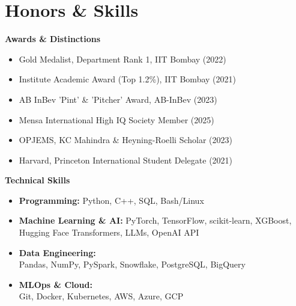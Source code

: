 \documentclass[letterpaper,10pt]{article}
\begin{document}
\section{Honors \& Skills}
{\small
\begin{multicols}{2}

{\vspace{-4pt}\scshape\raggedright\large\bfseries Awards \& Distinctions}\vspace{-6pt}
\begin{itemize}[leftmargin=0.15in, itemsep=-2pt]
  \item Gold Medalist, Department Rank 1, IIT Bombay (2022)
  \item Institute Academic Award (Top 1.2\%), IIT Bombay (2021)
  \item AB InBev 'Pint' \& 'Pitcher' Award, AB-InBev (2023)
  \item Mensa International High IQ Society Member (2025)
  \item OPJEMS, KC Mahindra \&  Heyning-Roelli Scholar  (2023)
  \item Harvard, Princeton International Student Delegate (2021)
\end{itemize}

\columnbreak

{\vspace{-4pt}\scshape\raggedright\large\bfseries Technical Skills}\vspace{4pt}
\begin{itemize}[leftmargin=0.15in]
  \item \textbf{Programming:} Python, C++, SQL, Bash/Linux 
  \item \textbf{Machine Learning \& AI:} PyTorch, TensorFlow, scikit-learn, XGBoost, Hugging Face Transformers, LLMs, OpenAI API
  \item \textbf{Data Engineering:}\\
      Pandas, NumPy, PySpark, Snowflake, PostgreSQL, BigQuery
  \item \textbf{MLOps \& Cloud:}\\
      Git, Docker, Kubernetes, AWS, Azure, GCP
\end{itemize}

\end{multicols}
}
\vspace{-16pt}
\end{document}
